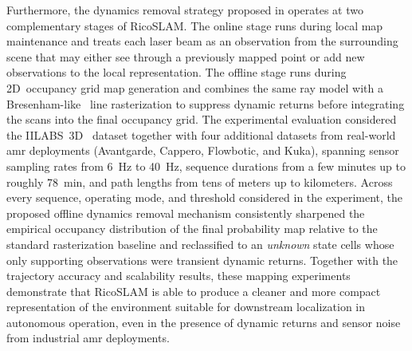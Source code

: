 Furthermore, the dynamics removal strategy proposed in 
operates at two complementary stages of RicoSLAM. The online stage
runs during local map maintenance and treats each laser beam as an
observation from the surrounding scene that may either see through a
previously mapped point or add new observations to the local
representation. The offline stage runs during 2D~occupancy grid map
generation and combines the same ray model with a
Bresenham-like~\cite{bresenham:ibm:1965,zingl:uas:2016} line
rasterization to suppress dynamic returns before integrating the
scans into the final occupancy grid. The experimental evaluation
considered the IILABS~3D~\cite{ribeiro:access:2025} dataset together
with four additional datasets from real-world \gls{amr} deployments
(Avantgarde, Cappero, Flowbotic, and Kuka), spanning sensor sampling
rates from \SI{6}{\hertz} to \SI{40}{\hertz}, sequence durations
from a few minutes up to roughly \SI{78}{\minute}, and path lengths
from tens of meters up to kilometers. Across every sequence,
operating mode, and threshold considered in the experiment, the
proposed offline dynamics removal mechanism consistently sharpened
the empirical occupancy distribution of the final probability map
relative to the standard rasterization baseline and reclassified to
an \emph{unknown} state cells whose only supporting observations were
transient dynamic returns. Together with the trajectory accuracy
and scalability results, these mapping experiments demonstrate that
RicoSLAM is able to produce a cleaner and more compact representation
of the environment suitable for downstream localization in
autonomous operation, even in the presence of dynamic returns and
sensor noise from industrial \gls{amr} deployments.

